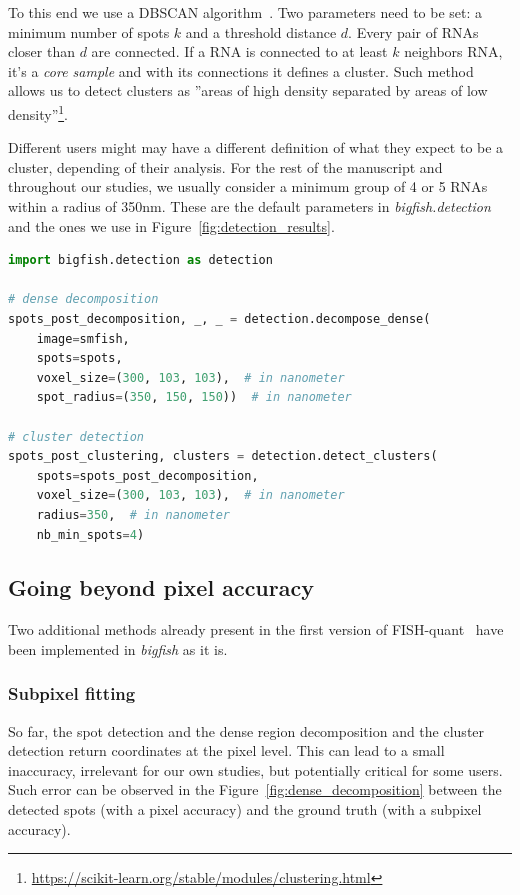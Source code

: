 To this end we use a DBSCAN algorithm~\cite{ester_density-based_1996, scikit-learn}.
Two parameters need to be set: a minimum number of spots $k$ and a threshold distance $d$.
Every pair of \ac{RNA}s closer than $d$ are connected.
If a \ac{RNA} is connected to at least $k$ neighbors \ac{RNA}, it's a \emph{core sample} and with its connections it defines a cluster.
Such method allows us to detect clusters as ''areas of high density separated by areas of low density''\footnote{\url{https://scikit-learn.org/stable/modules/clustering.html}}.

Different users might may have a different definition of what they expect to be a cluster, depending of their analysis.
For the rest of the manuscript and throughout our studies, we usually consider a minimum group of 4 or 5 \ac{RNA}s within a radius of 350nm.
These are the default parameters in \emph{bigfish.detection} and the ones we use in Figure~\ref{fig:detection_results}.\\

\begin{minipage}{0.9\textwidth}
\begin{lstlisting}[language=Python]
import bigfish.detection as detection

# dense decomposition
spots_post_decomposition, _, _ = detection.decompose_dense(
    image=smfish,
    spots=spots,
    voxel_size=(300, 103, 103),  # in nanometer
    spot_radius=(350, 150, 150))  # in nanometer

# cluster detection
spots_post_clustering, clusters = detection.detect_clusters(
    spots=spots_post_decomposition,
    voxel_size=(300, 103, 103),  # in nanometer
    radius=350,  # in nanometer
    nb_min_spots=4)
\end{lstlisting}
\end{minipage}

\subsection{Going beyond pixel accuracy}
\label{subsec:subpixel}

Two additional methods already present in the first version of FISH-quant~\cite{mueller_fish-quant_2013} have been implemented in \emph{bigfish} as it is.

\subsubsection{Subpixel fitting}

So far, the spot detection and the dense region decomposition and the cluster detection return coordinates at the pixel level.
This can lead to a small inaccuracy, irrelevant for our own studies, but potentially critical for some users.
Such error can be observed in the Figure~\ref{fig:dense_decomposition} between the detected spots (with a pixel accuracy) and the ground truth (with a subpixel accuracy).

